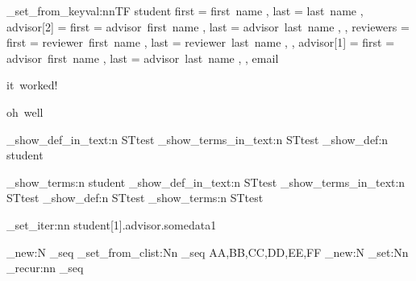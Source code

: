 \documentclass{article}
\begin{document}
        \starray_set_from_keyval:nnTF
        {student}
        {
          first = first~name ,
          last = last~name ,
          advisor[2] = {
            first = advisor~first~name ,
            last  = advisor~last~name ,
          } ,
          reviewers = {
            first = reviewer~first~name ,
            last  = reviewer~last~name ,
          } ,
          advisor[1] = {
            first = advisor~first~name ,
            last  = advisor~last~name ,
          } ,
          email
        }
        {\par it~worked!\par}
        {\par oh~well\par}

        \starray_show_def_in_text:n {STtest}
        \starray_show_terms_in_text:n {STtest}
        \starray_show_def:n {student}
        \par
        \starray_show_terms:n {student}
        \starray_show_def_in_text:n {STtest}
        \starray_show_terms_in_text:n {STtest}
        \starray_show_def:n {STtest}
        \starray_show_terms:n {STtest}

        \starray_set_iter:nn {student[1].advisor.somedata}{1}

\seq_new:N \test_seq
\seq_set_from_clist:Nn \test_seq {AA,BB,CC,DD,EE,FF}
\int_new:N \testint
\int_set:Nn 
\test_recur:nn  {\testint} {\test_seq}{}

\ExplSyntaxOff
\end{document}

